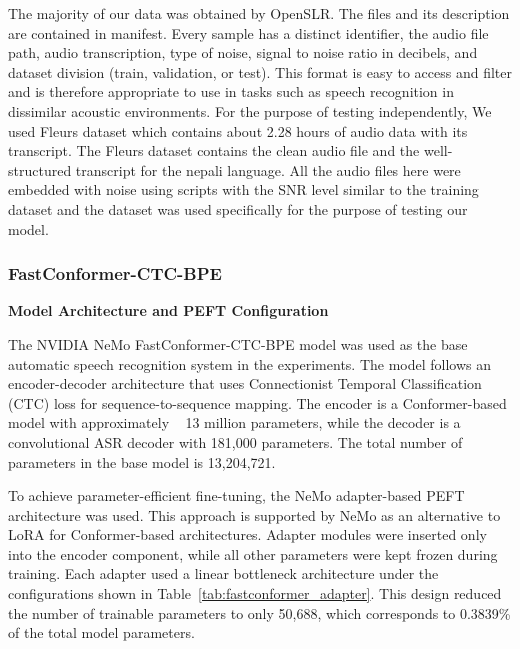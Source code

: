 The majority of our data was obtained by OpenSLR. The files and its description are contained in manifest. Every sample has a distinct identifier, the audio file path, audio transcription, type of noise, signal to noise ratio in decibels, and dataset division (train, validation, or test). This format is easy to access and filter and is therefore appropriate to use in tasks such as speech recognition in dissimilar acoustic environments. For the purpose of testing independently, We used Fleurs dataset which contains about 2.28 hours of audio data with its transcript. The Fleurs dataset contains the clean audio file and the well-structured transcript for the nepali language. All the audio files here were embedded with noise using scripts with the SNR level similar to the training dataset and the dataset was used specifically for the purpose of testing our model.


\subsubsection{FastConformer-CTC-BPE}

\textbf{Model Architecture and PEFT Configuration}

The NVIDIA NeMo FastConformer-CTC-BPE model was used as the base automatic speech recognition system in the experiments. The model follows an encoder-decoder architecture that uses Connectionist Temporal Classification (CTC) loss for sequence-to-sequence mapping. The encoder is a Conformer-based model with approximately ~ 13 million parameters, while the decoder is a convolutional ASR decoder with 181,000 parameters. The total number of parameters in the base model is 13,204,721.

To achieve parameter-efficient fine-tuning, the NeMo adapter-based PEFT architecture was used. This approach is supported by NeMo as an alternative to LoRA for Conformer-based architectures. Adapter modules were inserted only into the encoder component, while all other parameters were kept frozen during training. Each adapter used a linear bottleneck architecture under the configurations shown in Table~\ref{tab:fastconformer_adapter}. This design reduced the number of trainable parameters to only 50,688, which corresponds to 0.3839\% of the total model parameters.

